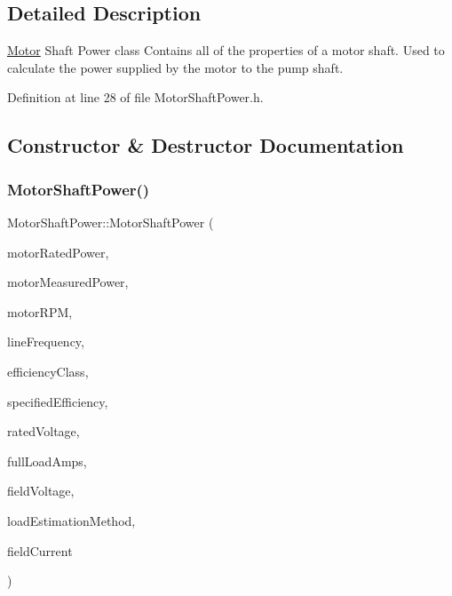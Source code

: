 \subsection{Detailed Description}
\hyperlink{struct_motor}{Motor} Shaft Power class Contains all of the properties of a motor shaft. Used to calculate the power supplied by the motor to the pump shaft. 

Definition at line 28 of file Motor\+Shaft\+Power.\+h.



\subsection{Constructor \& Destructor Documentation}
\mbox{\label{class_motor_shaft_power_acf65f63b1c78946df0987dd1a9a98c77}} 
\subsubsection{\texorpdfstring{Motor\+Shaft\+Power()}{MotorShaftPower()}\hspace{0.1cm}{\footnotesize\ttfamily [1/3]}}
{\footnotesize\ttfamily Motor\+Shaft\+Power\+::\+Motor\+Shaft\+Power (\begin{DoxyParamCaption}\item[{const double}]{motor\+Rated\+Power,  }\item[{const double}]{motor\+Measured\+Power,  }\item[{const double}]{motor\+R\+PM,  }\item[{const Motor\+::\+Line\+Frequency}]{line\+Frequency,  }\item[{const Motor\+::\+Efficiency\+Class}]{efficiency\+Class,  }\item[{const double}]{specified\+Efficiency,  }\item[{const double}]{rated\+Voltage,  }\item[{const double}]{full\+Load\+Amps,  }\item[{const double}]{field\+Voltage,  }\item[{const Motor\+::\+Load\+Estimation\+Method}]{load\+Estimation\+Method,  }\item[{const double}]{field\+Current }\end{DoxyParamCaption})\hspace{0.3cm}{\ttfamily [inline]}}


